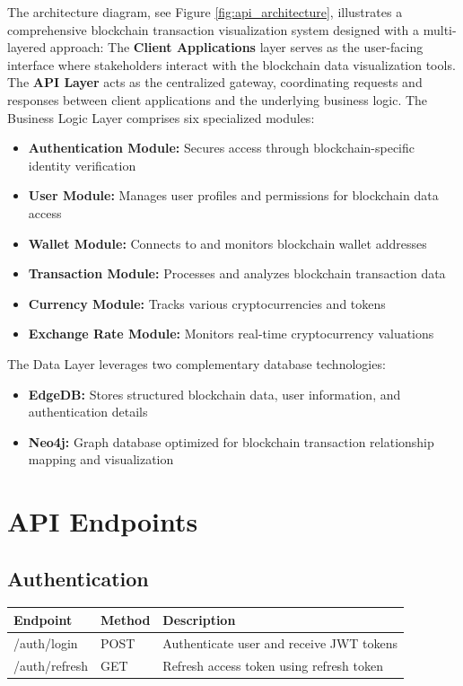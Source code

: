 The architecture diagram, see Figure \ref{fig:api_architecture}, illustrates a comprehensive blockchain transaction visualization system designed with a multi-layered approach:
The \textbf{Client Applications} layer serves as the user-facing interface where stakeholders interact with the blockchain data visualization tools.
The \textbf{API Layer} acts as the centralized gateway, coordinating requests and responses between client applications and the underlying business logic.
The Business Logic Layer comprises six specialized modules:
\begin{itemize}
\item \textbf{Authentication Module:} Secures access through blockchain-specific identity verification
\item \textbf{User Module:} Manages user profiles and permissions for blockchain data access
\item \textbf{Wallet Module:} Connects to and monitors blockchain wallet addresses
\item \textbf{Transaction Module:} Processes and analyzes blockchain transaction data
\item \textbf{Currency Module:} Tracks various cryptocurrencies and tokens
\item \textbf{Exchange Rate Module:} Monitors real-time cryptocurrency valuations
\end{itemize}
The Data Layer leverages two complementary database technologies:
\begin{itemize}
\item \textbf{EdgeDB:} Stores structured blockchain data, user information, and authentication details
\item \textbf{Neo4j:} Graph database optimized for blockchain transaction relationship mapping and visualization
\end{itemize}

\section{API Endpoints}

\subsection*{Authentication}
\renewcommand{\arraystretch}{1.5}
\begin{tabular}{|p{}|p{}|p{}|}
\hline
\textbf{Endpoint} & \textbf{Method} & \textbf{Description} \\
\hline
/auth/login & POST & Authenticate user and receive JWT tokens \\
\hline
/auth/refresh & GET & Refresh access token using refresh token \\
\hline
\end{tabular}

